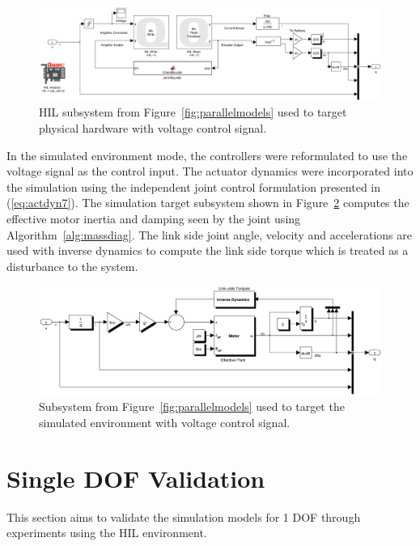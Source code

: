 \begin{figure}[!h]
	\centering
    \includegraphics[scale=0.45]{fig/experiments/hilmodel.eps} 
  	\caption{HIL subsystem from Figure~\ref{fig:parallelmodels} used to target physical hardware with voltage control signal.}
	\label{fig:hilmodel}
\end{figure}

In the simulated environment mode, the controllers were reformulated to use the voltage signal as the control input. The actuator dynamics were incorporated into the simulation using the independent joint control formulation presented in (\ref{eq:actdyn7}). The simulation target subsystem shown in Figure~\ref{fig:simmodel} computes the effective motor inertia and damping seen by the joint using Algorithm~\ref{alg:massdiag}. The link side joint angle, velocity and accelerations are used with inverse dynamics to compute the link side torque which is treated as a disturbance to the system. 

\begin{figure}[!h]
	\centering
    \includegraphics[scale=0.55]{fig/experiments/simmodel.eps} 
  	\caption{Subsystem from Figure~\ref{fig:parallelmodels} used to target the simulated environment with voltage control signal.}
	\label{fig:simmodel}
\end{figure}




\section{Single DOF Validation} %
\label{sec:1dof_validation}
This section aims to validate the simulation models for 1 DOF through experiments using the HIL environment. 

